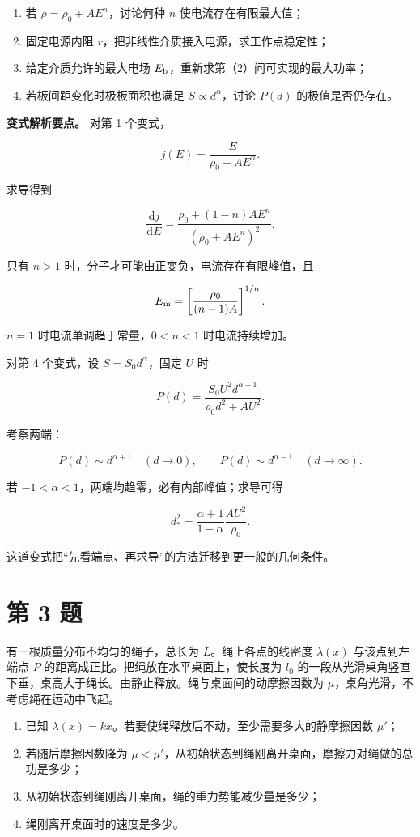 \documentclass[12pt,a4paper,UTF8]{ctexart}
\newcommand{\tightlist}{\setlength{\itemsep}{0pt}\setlength{\parskip}{0pt}}
\begin{document}
\begin{enumerate}
\def\labelenumi{\arabic{enumi}.}
\tightlist
\item
  若 \(\rho=\rho_0+AE^n\)，讨论何种 \(n\) 使电流存在有限最大值；
\item
  固定电源内阻 \(r\)，把非线性介质接入电源，求工作点稳定性；
\item
  给定介质允许的最大电场
  \(E_{\rm b}\)，重新求第（2）问可实现的最大功率；
\item
  若板间距变化时极板面积也满足 \(S\propto d^\alpha\)，讨论 \(P(d)\)
  的极值是否仍存在。
\end{enumerate}

\textbf{变式解析要点。} 对第 1 个变式，

\[
j(E)=\frac{E}{\rho_0+AE^n}.
\]

求导得到

\[
\frac{\mathrm dj}{\mathrm dE}
=\frac{\rho_0+(1-n)AE^n}
{(\rho_0+AE^n)^2}.
\]

只有 \(n>1\) 时，分子才可能由正变负，电流存在有限峰值，且

\[
E_{\rm m}
=\left[\frac{\rho_0}{(n-1)A}\right]^{1/n}.
\]

\(n=1\) 时电流单调趋于常量，\(0<n<1\) 时电流持续增加。

对第 4 个变式，设 \(S=S_0d^\alpha\)，固定 \(U\) 时

\[
P(d)
=\frac{S_0U^2d^{\alpha+1}}
{\rho_0d^2+AU^2}.
\]

考察两端：

\[
P(d)\sim d^{\alpha+1}\quad(d\to0),
\qquad
P(d)\sim d^{\alpha-1}\quad(d\to\infty).
\]

若 \(-1<\alpha<1\)，两端均趋零，必有内部峰值；求导可得

\[
d_*^2
=\frac{\alpha+1}{1-\alpha}
\frac{AU^2}{\rho_0}.
\]

这道变式把``先看端点、再求导''的方法迁移到更一般的几何条件。

\newpage

\section{第 3 题}\label{ux7b2c-3-ux9898}

有一根质量分布不均匀的绳子，总长为 \(L\)。绳上各点的线密度
\(\lambda(x)\) 与该点到左端点 \(P\)
的距离成正比。把绳放在水平桌面上，使长度为 \(l_0\)
的一段从光滑桌角竖直下垂，桌高大于绳长。由静止释放。绳与桌面间的动摩擦因数为
\(\mu\)，桌角光滑，不考虑绳在运动中飞起。

\begin{enumerate}
\def\labelenumi{\arabic{enumi}.}
\tightlist
\item
  已知 \(\lambda(x)=kx\)。若要使绳释放后不动，至少需要多大的静摩擦因数
  \(\mu'\)；
\item
  若随后摩擦因数降为
  \(\mu<\mu'\)，从初始状态到绳刚离开桌面，摩擦力对绳做的总功是多少；
\item
  从初始状态到绳刚离开桌面，绳的重力势能减少量是多少；
\item
  绳刚离开桌面时的速度是多少。
\end{enumerate}
\end{document}
